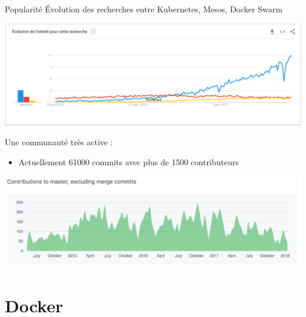 \documentclass{bredelebeamer}
\begin{document}
\begin{frame}{Popularité}
Évolution des recherches entre \textcolor{Framableu}{Kubernetes}, \textcolor{Framarouge}{Mesos}, \textcolor{Framajaune}{Docker Swarm}
\begin{center}
\includegraphics[scale=0.25]{images/img2.png}
\end{center}\pause
Une communauté très active : 
\begin{itemize}
\item Actuellement 61000 commits avec plus de 1500 contributeurs
\end{itemize}
\begin{center}
\includegraphics[scale=0.3]{images/img3.png}
\end{center}
\end{frame}

\section{Docker}
\end{document}
